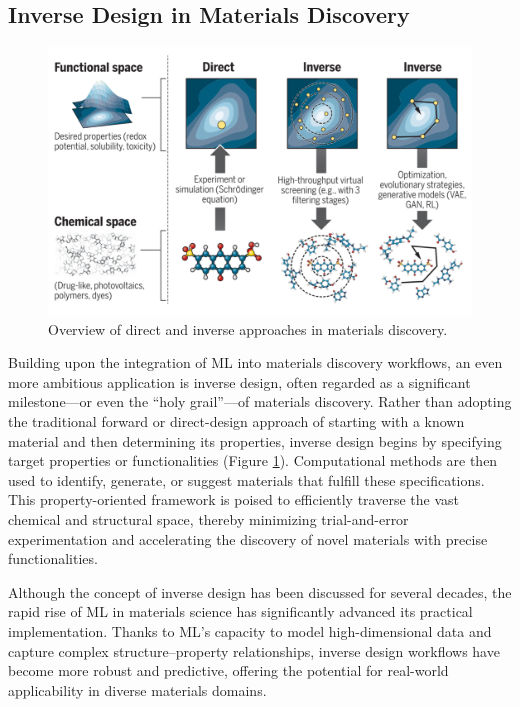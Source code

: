 \subsection{Inverse Design in Materials Discovery}

\begin{figure}[ht]
    \centering
    \includegraphics[width=\textwidth]{figures/literature-review/figure2-6.png}
    \caption{Overview of direct and inverse approaches in materials discovery\cite{RN361}.}
    \label{fig:figure2.6}
\end{figure}

Building upon the integration of ML into materials discovery workflows, an even more ambitious application is inverse design, often regarded as a significant milestone—or even the “holy grail”—of materials discovery. Rather than adopting the traditional forward or direct-design approach of starting with a known material and then determining its properties, inverse design begins by specifying target properties or functionalities (Figure \ref{fig:figure2.6}). Computational methods are then used to identify, generate, or suggest materials that fulfill these specifications. This property-oriented framework is poised to efficiently traverse the vast chemical and structural space, thereby minimizing trial-and-error experimentation and accelerating the discovery of novel materials with precise functionalities\cite{RN361,RN547}.

Although the concept of inverse design has been discussed for several decades, the rapid rise of ML in materials science has significantly advanced its practical implementation. Thanks to ML’s capacity to model high-dimensional data and capture complex structure–property relationships, inverse design workflows have become more robust and predictive, offering the potential for real-world applicability in diverse materials domains.

